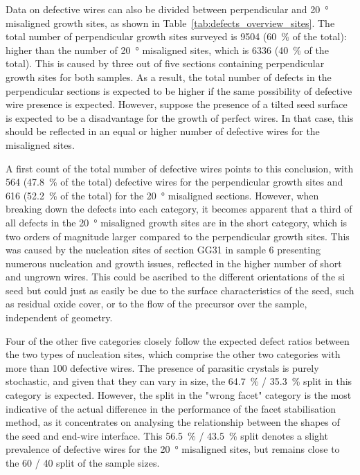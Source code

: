 Data on defective wires can also be divided between perpendicular and \qty{20}{\degree} misaligned growth sites, as shown in Table~\ref{tab:defects_overview_sites}. The total number of perpendicular growth sites surveyed is \num{9504} (\qty{60}{\%} of the total): higher than the number of \qty{20}{\degree} misaligned sites, which is \num{6336} (\qty{40}{\%} of the total). This is caused by three out of five sections containing perpendicular growth sites for both samples. As a result, the total number of defects in the perpendicular sections is expected to be higher if the same possibility of defective wire presence is expected. However, suppose the presence of a tilted seed surface is expected to be a disadvantage for the growth of perfect wires. In that case, this should be reflected in an equal or higher number of defective wires for the misaligned sites.

A first count of the total number of defective wires points to this conclusion, with \num{564} (\qty{47.8}{\%} of the total) defective wires for the perpendicular growth sites and \num{616} (\qty{52.2}{\%} of the total) for the \qty{20}{\degree} misaligned sections. However, when breaking down the defects into each category, it becomes apparent that a third of all defects in the \qty{20}{\degree} misaligned growth sites are in the short category, which is two orders of magnitude larger compared to the perpendicular growth sites. This was caused by the nucleation sites of section GG31 in sample 6 presenting numerous nucleation and growth issues, reflected in the higher number of short and ungrown wires. This could be ascribed to the different orientations of the \acl{si} seed but could just as easily be due to the surface characteristics of the seed, such as residual oxide cover, or to the flow of the precursor over the sample, independent of geometry.

Four of the other five categories closely follow the expected defect ratios between the two types of nucleation sites, which comprise the other two categories with more than \num{100} defective wires. The presence of parasitic crystals is purely stochastic, and given that they can vary in size, the \qty{64.7}{\%} / \qty{35.3}{\%} split in this category is expected. However, the split in the "wrong facet" category is the most indicative of the actual difference in the performance of the facet stabilisation method, as it concentrates on analysing the relationship between the shapes of the seed and end-wire interface. This \qty{56.5}{\%} / \qty{43.5}{\%} split denotes a slight prevalence of defective wires for the \qty{20}{\degree} misaligned sites, but remains close to the \num{60} / \num{40} split of the sample sizes.

